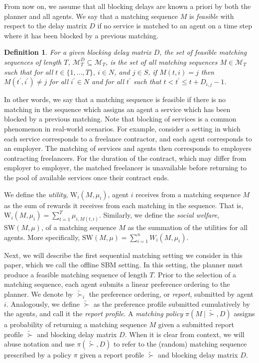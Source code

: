 \documentclass[letterpaper,11pt]{article}
\newtheorem{defn}{Definition}
\begin{document}
    From now on, we assume that all blocking delays are known a priori by both the planner and all agents. 
    We say that a matching sequence $M$ is \emph{feasible} with respect to the delay matrix $D$ if no service is matched to an agent on a time step where it has been blocked by a previous matching.
    \begin{defn}
    For a given blocking delay matrix $D$, the set of feasible matching sequences of length $T$, $\mathcal{M}^{D}_{T} \subseteq \mathcal{M}_{T}$, is the set of all matching sequences $M \in \mathcal{M}_{T}$ such that for all $t \in \{1, \dots, T\}$, $i \in N$, and $j \in S$, if $M(t, i) = j$ then $M(t^{\prime}, i^{\prime}) \neq j$ for all $i^{\prime} \in N$ and for all $t^{\prime}$ such that $t < t^{\prime} \leq t + D_{i, j} - 1$.
    \end{defn}
    In other words, we say that a matching sequence is feasible if there is no matching in the sequence which assigns an agent a service which has been blocked by a previous matching. Note that blocking of services is a common phenomenon in real-world scenarios. For example, consider a setting in which each service corresponds to a freelance contractor, and each agent corresponds to an employer. The matching of services and agents then corresponds to employers contracting freelancers. For the duration of the contract, which may differ from employer to employer, the matched freelancer is unavailable before returning to the pool of available services once their contract ends.
    
    We define the \emph{utility}, $\textrm{W}_{i}(M, \mu_{i})$, agent $i$ receives from a matching sequence $M$ as the sum of rewards it receives from each matching in the sequence. That is, $\textrm{W}_{i}(M, \mu_{i}) = \sum^{T}_{t=1}\mu_{i, M(t, i)}$. Similarly, we define the \emph{social welfare}, $\textrm{SW}(M, \mu)$, of a matching sequence $M$ as the summation of the utilities for all agents. More specifically, $\textrm{SW}(M, \mu) = \sum^{n}_{i=1}W_{i}(M, \mu_{i})$.  %
    
    Next, we will describe the first sequential matching setting we consider in this paper, which we call the offline SBM setting. In this setting, the planner must produce a feasible matching sequence of length $T$. Prior to the selection of a matching sequence, each agent submits a linear preference ordering to the planner. We denote by $\tilde{\succ}_{i}$ the preference ordering, or \emph{report}, submitted by agent $i$. Analogously, we define $\tilde{\succ}$ as the preference profile submitted cumulatively by the agents, and call it the \emph{report profile}. A \emph{matching policy} $\pi(M\: |\: \tilde{\succ}, D)$ assigns a probability of returning a matching sequence $M$ given a submitted report profile $\tilde{\succ}$ and blocking delay matrix $D$. When it is clear from context, we will abuse notation and use $\pi(\tilde{\succ}, D)$ to refer to the (random) matching sequence prescribed by a policy $\pi$ given a report profile $\tilde{\succ}$ and blocking delay matrix $D$. 
    
\end{document}
